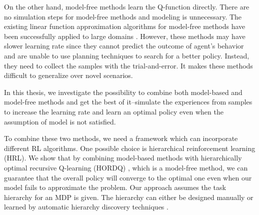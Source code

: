 On the other hand, model-free methods learn the Q-function directly. 
There are no simulation steps for model-free methods and modeling is unnecessary. 
The existing linear function approximation algorithms for model-free methods have been successfully 
applied to large domains \cite{LSTD99, KeepAway}. 
However, these methods may have slower learning rate since they cannot predict
the outcome of agent's behavior and are unable to use planning techniques to 
search for a better policy. Instead, they need to collect the samples with the trial-and-error.
It makes these methods difficult to generalize over novel scenarios.



In this thesis, we investigate the possibility to combine both model-based and model-free methods 
and get the best of it--simulate the experiences from samples to increase the learning rate
and learn an optimal policy even when the assumption of model is not satisfied. 

To combine these two methods, we need a framework which can incorporate different RL algorithms.
One possible choice is hierarchical reinforcement learning (HRL). 
We show that by combining model-based methods with 
hierarchically optimal recursive Q-learning (HORDQ) \cite{HORDQ}, which is a model-free method, we can 
guarantee that the overall policy will converge to the optimal one even when our model
fails to approximate the problem. 
Our approach assumes the task hierarchy for an MDP is given. The hierarchy can either be 
designed manually or learned by automatic hierarchy discovery techniques \cite{HexQ}.


